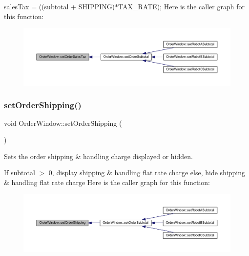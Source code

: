 sales\+Tax = ((subtotal + S\+H\+I\+P\+P\+I\+NG)$\ast$\+T\+A\+X\+\_\+\+R\+A\+TE); Here is the caller graph for this function\+:\nopagebreak
\begin{figure}[H]
\begin{center}
\leavevmode
\includegraphics[width=350pt]{class_order_window_a6dfbb77a1a8911cc789062c6c00b7fe5_icgraph}
\end{center}
\end{figure}
\mbox{\label{class_order_window_aa2a0cfb3003fd66954cc540dd9db23b8}} 
\subsubsection{\texorpdfstring{set\+Order\+Shipping()}{setOrderShipping()}}
{\footnotesize\ttfamily void Order\+Window\+::set\+Order\+Shipping (\begin{DoxyParamCaption}{ }\end{DoxyParamCaption})}



Sets the order shipping \& handling charge displayed or hidden. 

If subtotal $>$ 0, display shipping \& handling flat rate charge else, hide shipping \& handling flat rate charge Here is the caller graph for this function\+:\nopagebreak
\begin{figure}[H]
\begin{center}
\leavevmode
\includegraphics[width=350pt]{class_order_window_aa2a0cfb3003fd66954cc540dd9db23b8_icgraph}
\end{center}
\end{figure}
\mbox{\label{class_order_window_a9b1e24f50bfc70c3920932f58331f917}} 
